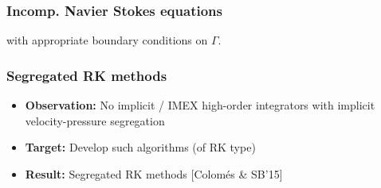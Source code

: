 \begin{frame}[t]
\frametitle{Incomp. Navier Stokes equations}
with appropriate boundary conditions on $ \Gamma$.\vskip 0.3cm
\end{frame}
\begin{frame}
\frametitle{Segregated RK methods}
\vfill
\begin{itemize}
\item<1-> \textbf{Observation:} No implicit / IMEX high-order integrators with implicit velocity-pressure segregation
\item<2-> \textbf{Target:} Develop such algorithms (of RK type)
\item<3-> \textbf{Result:} Segregated RK methods [Colom\'es \& SB'15]
\end{itemize}
\vfill
\end{frame}
